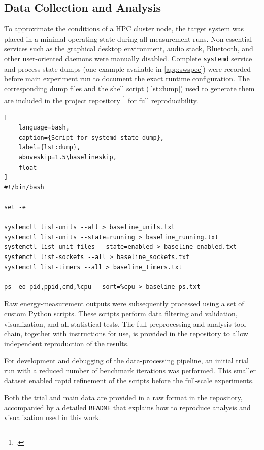 \subsection{Data Collection and Analysis}

To approximate the conditions of a \gls{HPC} cluster node, the target system
was placed in a minimal operating state during all measurement runs.
Non-essential services such as the graphical desktop environment, audio stack,
Bluetooth, and other user-oriented daemons were manually disabled.
Complete \texttt{systemd} service and process state dumps (one example available in
\cref{app:swspec}) were recorded before main experiment run to document the exact
runtime configuration. The corresponding dump files and the shell script
(\cref{lst:dump}) used to generate them are included in the project repository
\footcite{yahdzhyiev2025repo} for full reproducibility.

\begin{samepage}
\begin{lstlisting}[
    language=bash,
    caption={Script for systemd state dump},
    label={lst:dump},
    aboveskip=1.5\baselineskip,
    float
]
#!/bin/bash

set -e

systemctl list-units --all > baseline_units.txt
systemctl list-units --state=running > baseline_running.txt
systemctl list-unit-files --state=enabled > baseline_enabled.txt
systemctl list-sockets --all > baseline_sockets.txt
systemctl list-timers --all > baseline_timers.txt

ps -eo pid,ppid,cmd,%cpu --sort=%cpu > baseline-ps.txt
\end{lstlisting}
\end{samepage}

Raw energy-measurement outputs were subsequently processed using a set of custom
Python scripts. These scripts perform data filtering and validation,
visualization, and all statistical tests. The full preprocessing and analysis
tool-chain, together with instructions for use, is provided in the repository
to allow independent reproduction of the results.

For development and debugging of the data-processing pipeline, an initial
trial run with a reduced number of benchmark iterations was performed.
This smaller dataset enabled rapid refinement of the scripts before the
full-scale experiments.

Both the trial and main data are provided in a raw format in the repository,
accompanied by a detailed \texttt{README} that explains how to reproduce
analysis and visualization used in this work.
